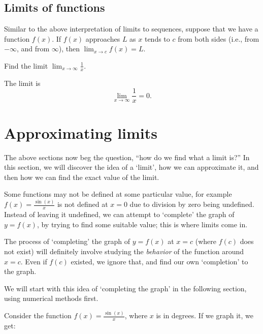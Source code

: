 \subsection{Limits of functions}
Similar to the above interpretation of limits to sequences, suppose that we have a function
$f(x)$. If $f(x)$ approaches $L$ as $x$ tends to $c$ from both sides (i.e., from $-\infty$, and from $\infty$),
then $\lim_{x \to c} f(x) = L$.

\begin{example}
    Find the limit $\lim_{x \to \infty} \frac{1}{x}$.
\end{example}
\begin{solution}
    The limit is \[\lim_{x \to \infty} \frac{1}{x} = 0.\]
\end{solution}

\section{Approximating limits}
The above sections now beg the question, ``how do we find what a limit is?'' In this section, we will discover the
idea of a `limit', how we can approximate it, and then how we can find the exact value of the limit.

Some functions may not be defined at some particular value, for example
$f(x) = \frac{\sin(x)}{x}$ is not defined at $x = 0$ due to division by zero being undefined.
Instead of leaving it undefined, we can attempt to `complete' the graph of $y = f(x)$, by trying
to find some suitable value; this is where limits come in.

The process of `completing' the graph of $y = f(x)$ at $x = c$ (where $f(c)$ does not exist) will
definitely involve studying the \textit{behavior} of the function around $x = c$. Even if $f(c)$ existed,
we ignore that, and find our own `completion' to the graph.

We will start with this idea of `completing the graph' in the following section, using numerical methods first.

Consider the function $f(x) = \frac{\sin(x)}{x}$, where $x$ is in degrees. If we graph it, we get:

